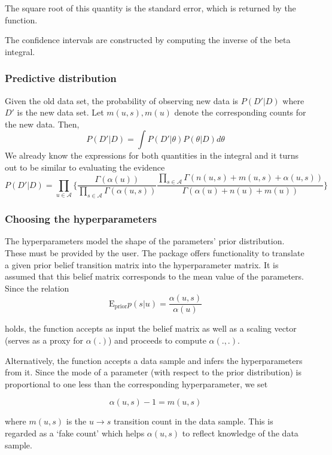\documentclass[
  nojss]{jss}
\begin{document}
The square root of this quantity is the standard error, which is returned by the function.

The confidence intervals are constructed by computing the inverse of the beta integral.

\hypertarget{predictive-distribution}{%
\subsubsection{Predictive distribution}\label{predictive-distribution}}

Given the old data set, the probability of observing new data is \(P(D'|D)\) where \(D'\) is the new data set. Let \(m(u, s), m(u)\) denote the corresponding counts for the new data. Then,
\[
P(D'|D) = \int P(D' | \theta) P(\theta | D) d\theta
\]
We already know the expressions for both quantities in the integral and it turns out to be similar to evaluating the evidence
\[
P(D'|D) = \prod_{u \in \mathcal{A}} \Big\{ \frac{\Gamma(\alpha(u))}{\prod_{s \in \mathcal{A}} \Gamma(\alpha(u, s))} \frac{\prod_{s \in \mathcal{A}} \Gamma(n(u, s) + m(u, s) + \alpha(u, s))}{\Gamma(\alpha(u) + n(u) + m(u))} \Big\}
\]

\hypertarget{choosing-the-hyperparameters}{%
\subsubsection{Choosing the hyperparameters}\label{choosing-the-hyperparameters}}

The hyperparameters model the shape of the parameters' prior distribution. These must be provided by the user. The package offers functionality to translate a given prior belief transition matrix into the hyperparameter matrix. It is assumed that this belief matrix corresponds to the mean value of the parameters. Since the relation
\[
\text{E}_{\text{prior}} p(s | u) = \frac{\alpha(u, s)}{\alpha(u)}
\]

holds, the function accepts as input the belief matrix as well as a scaling vector (serves as a proxy for \(\alpha(.)\)) and proceeds to compute \(\alpha(., .)\).

Alternatively, the function accepts a data sample and infers the hyperparameters from it. Since the mode of a parameter (with respect to the prior distribution) is proportional to one less than the corresponding hyperparameter, we set

\[
\alpha(u, s) - 1 = m(u, s)
\]

where \(m(u, s)\) is the \(u\rightarrow s\) transition count in the data sample. This is regarded as a `fake count' which helps \(\alpha(u, s)\) to reflect knowledge of the data sample.
\end{document}
